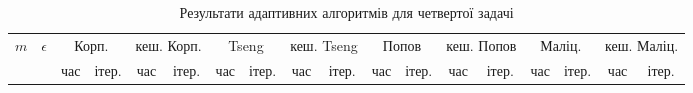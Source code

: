 \begin{table}[H]
    \centering
    \begin{tabular}{||c|c||c|c|c|c||c|c|c|c||c|c|c|c||c|c|c|c||} \hline \hline
        \multirow{2}{*}{$m$} & \multirow{2}{*}{$\epsilon$} & \multicolumn{2}{c|}{Корп.} & \multicolumn{2}{c||}{кеш. Корп.} & \multicolumn{2}{c|}{Tseng} & \multicolumn{2}{c||}{кеш. Tseng} & \multicolumn{2}{c|}{Попов} & \multicolumn{2}{c||}{кеш. Попов} & \multicolumn{2}{c|}{Маліц.} & \multicolumn{2}{c||}{кеш. Маліц.} \\ \cline{3-18}
        & & час & ітер. & час & ітер. & час & ітер. & час & ітер. & час & ітер. & час & ітер. & час & ітер. & час & ітер. \\ \hline \hline

        \hline
    \end{tabular}
    \caption{Результати адаптивних алгоритмів для четвертої задачі}
    \label{tab:4-adapt}
\end{table}